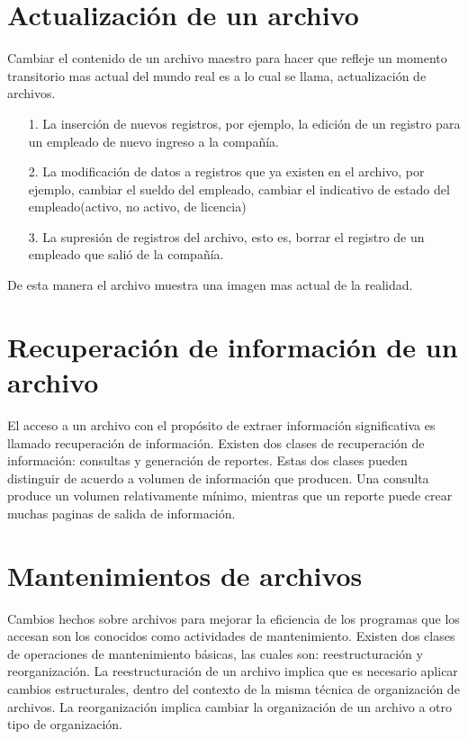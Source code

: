 \section{Actualización de un archivo}

Cambiar el contenido de un archivo maestro para hacer que refleje un momento transitorio mas actual del mundo real es a lo cual se llama, actualización de archivos.
\begin{itemize}
\item[1.] La inserción de nuevos registros, por ejemplo, la edición de un registro para un empleado de nuevo ingreso a la compañía.
\item[2.] La modificación de datos a registros que ya existen en el archivo, por ejemplo, cambiar el sueldo del empleado, cambiar el indicativo de estado del empleado(activo, no activo, de licencia)
\item[3.] La supresión de registros del archivo, esto es, borrar el registro de un empleado que salió de la compañía. 
\end{itemize}

De esta manera el archivo muestra una imagen mas actual de la realidad.

\section{Recuperación de información de un archivo}

El acceso a un archivo con el propósito de extraer información significativa es llamado recuperación de información. Existen dos clases de recuperación de información: consultas y generación de reportes. Estas dos clases pueden distinguir de acuerdo a volumen de información que producen. Una consulta produce un volumen relativamente mínimo, mientras que un reporte puede crear muchas paginas de salida de información.

\section{Mantenimientos de archivos}

Cambios hechos sobre archivos para mejorar la eficiencia de los programas que los accesan son los conocidos como actividades de mantenimiento. Existen dos clases de operaciones de mantenimiento básicas, las cuales son: reestructuración y reorganización. La reestructuración de un archivo implica que es necesario aplicar cambios estructurales, dentro del contexto de la misma técnica de organización de archivos. La reorganización implica cambiar la organización de un archivo a otro tipo de organización.

